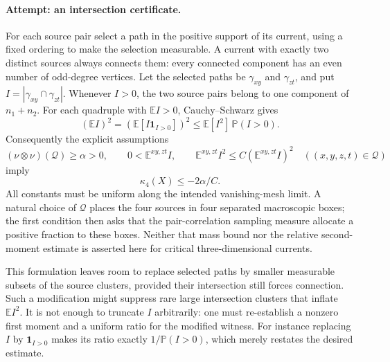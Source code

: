 \documentclass[11pt,a4paper]{article}
\numberwithin{equation}{section}
\begin{document}
\paragraph{Attempt: an intersection certificate.}
For each source pair select a path in the positive support of its current,
using a fixed ordering to make the selection measurable. A current with
exactly two distinct sources always connects them: every connected
component has an even number of odd-degree vertices. Let the selected
paths be $\gamma_{xy}$ and $\gamma_{zt}$, and put
$I=|\gamma_{xy}\cap\gamma_{zt}|$.
Whenever $I>0$, the two source pairs belong to one component of $n_1+n_2$.
For each quadruple with $\mathbb E I>0$, Cauchy--Schwarz gives
\[
 (\mathbb E I)^2
   =(\mathbb E[I\mathbf1_{I>0}])^2
   \leq\mathbb E[I^2]\,\mathbb P(I>0).
\]
Consequently the explicit assumptions
\begin{equation}\label{eq73:missing}
 (\nu\otimes\nu)(\mathcal Q)\geq\alpha>0,
 \qquad 0<\mathbb E^{xy,zt}I,
 \qquad \mathbb E^{xy,zt}I^2\leq C(\mathbb E^{xy,zt}I)^2
 \quad((x,y,z,t)\in\mathcal Q)
\end{equation}
imply
\begin{equation}\label{eq73:gap}
 \kappa_4(X)\leq-2\alpha/C.
\end{equation}
All constants must be uniform along the intended vanishing-mesh limit.
A natural choice of $\mathcal Q$ places the four sources in four separated
macroscopic boxes; the first condition then asks that the pair-correlation
sampling measure allocate a positive fraction to these boxes. Neither
that mass bound nor the relative second-moment estimate is asserted here
for critical three-dimensional currents.

This formulation leaves room to replace selected paths by smaller
measurable subsets of the source clusters, provided their intersection
still forces connection. Such a modification might suppress rare large
intersection clusters that inflate $\mathbb E I^2$. It is not enough to
truncate $I$ arbitrarily: one must re-establish a nonzero first moment and
a uniform ratio for the modified witness. For instance replacing $I$ by
$\mathbf1_{I>0}$ makes its ratio exactly $1/\mathbb P(I>0)$, which merely
restates the desired estimate.
\end{document}
